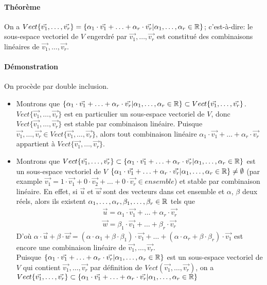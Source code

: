 \paragraph{Théorème} On a $Vect\{\vec{v_1}, \ldots, \vec{v_r}\} = \{\alpha_1 \cdot \vec{v_1} + \ldots + \alpha_r \cdot \vec{v_r} | \alpha_1, \ldots, \alpha_r \in \mathbb{R} \}$; c'est-à-dire: le sous-espace vectoriel de $V$ engerdré par $\vec{v_1}, \ldots, \vec{v_r}$ est constitué des combinaisons linéaires de $\vec{v_1}, \ldots, \vec{v_r}$.
\paragraph{Démonstration} On procède par double inclusion.
\begin{itemize}
  \item Montrons que $\{\alpha_1 \cdot \vec{v_1} + \ldots + \alpha_r \cdot \vec{v_r} | \alpha_1, \ldots, \alpha_r \in \mathbb{R} \} \subset Vect\{\vec{v_1}, \ldots, \vec{v_r}\}$. $Vect\{\vec{v_1}, \ldots, \vec{v_r}\}$ est en particulier un sous-espace vectoriel de $V$, donc $Vect\{\vec{v_1}, \ldots, \vec{v_r}\}$ est stable par combinaison linéaire. Puisque $\vec{v_1}, \ldots, \vec{v_r} \in Vect\{\vec{v_1}, \ldots, \vec{v_r}\}$, alors tout combinaison linéaire $\alpha_1 \cdot \vec{v_1} + \ldots + \alpha_r \cdot \vec{v_r}$ appartient à $Vect\{\vec{v_1}, \ldots, \vec{v_r}\}$.
  
  \item Montrons que $Vect\{\vec{v_1}, \ldots, \vec{v_r}\} \subset \{\alpha_1 \cdot \vec{v_1} + \ldots + \alpha_r \cdot \vec{v_r} | \alpha_1, \ldots, \alpha_r \in \mathbb{R} \}$ est un sous-espace vectoriel de $V$ $\{\alpha_1 \cdot \vec{v_1} + \ldots + \alpha_r \cdot \vec{v_r} | \alpha_1, \ldots, \alpha_r \in \mathbb{R} \} \neq \emptyset$ (par example $\vec{v_1} = 1 \cdot \vec{v_1} + 0 \cdot \vec{v_2} + \ldots + 0 \cdot \vec{v_r} \in ensemble$) et stable par combinaison linéaire. En effet, si $\vec{u}$ et $\vec{w}$ sont des vecteurs dans cet ensemble et $\alpha$, $\beta$ deux réels, alors ils existent $\alpha_1, \ldots, \alpha_r, \beta_1, \ldots, \beta_r \in \mathbb{R}$ tels que
    \begin{eqnarray*}
      \vec{u} = \alpha_1 \cdot \vec{v_1} + \ldots + \alpha_r \cdot \vec{v_r} \\
      \vec{w} = \beta_1 \cdot \vec{v_1} + \ldots + \beta_r \cdot \vec{v_r}
    \end{eqnarray*}
    D'où $\alpha \cdot \vec{u} + \beta \cdot \vec{w} = (\alpha \cdot \alpha_1 + \beta \cdot \beta_1)\cdot \vec{v_1} + \ldots + (\alpha \cdot \alpha_r + \beta \cdot \beta_r)\cdot \vec{v_1}$ est encore une combinaison linéaire de $\vec{v_1}, \ldots, \vec{v_r}$. \\
    Puisque $\{\alpha_1 \cdot \vec{v_1} + \ldots + \alpha_r \cdot \vec{v_r} | \alpha_1, \ldots, \alpha_r \in \mathbb{R} \}$ est un sous-espace vectoriel de $V$ qui contient $\vec{v_1}, \ldots, \vec{v_r}$ par définition de $Vect(\vec{v_1}, \ldots, \vec{v_r})$, on a $Vect\{\vec{v_1}, \ldots, \vec{v_r}\} \subset \{\alpha_1 \cdot \vec{v_1} + \ldots + \alpha_r \cdot \vec{v_r} | \alpha_1, \ldots, \alpha_r \in \mathbb{R} \}$
\end{itemize}

